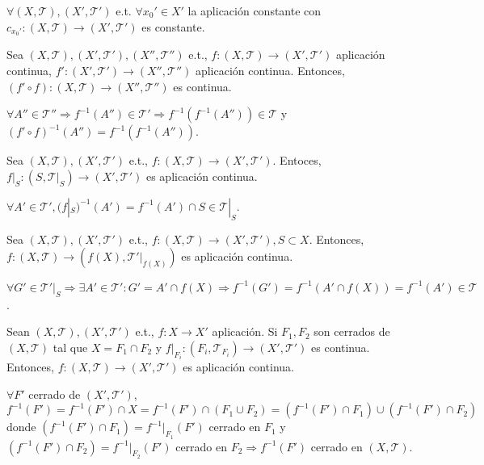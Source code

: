 \begin{obs}
  $\forall ( X, \mathcal{T} ), ( X', \mathcal{T}' )$ e.t. $\forall x_{0}' \in X'$ la aplicación constante con $c_{x_{0}'}: ( X, \mathcal{T} ) \to ( X', \mathcal{T}' )$ es constante.
\end{obs}

\begin{prop}
  Sea $( X, \mathcal{T} ), ( X', \mathcal{T}' ), ( X'', \mathcal{T}'' )$ e.t., $f: ( X, \mathcal{T} ) \to ( X', \mathcal{T}' )$ aplicación continua, $f': ( X', \mathcal{T}' ) \to ( X'', \mathcal{T}'' )$ aplicación continua. Entonces, $(f' \circ f): ( X, \mathcal{T} ) \to ( X'', \mathcal{T}'' )$ es continua.
\end{prop}

\begin{dem}
  $\forall A'' \in \mathcal{T''} \Rightarrow f^{-1}(A'') \in \mathcal{T}' \Rightarrow f^{-1}(f^{-1}(A'')) \in \mathcal{T}$ y $(f' \circ f)^{-1}(A'') = f^{-1}(f^{-1}(A''))$.
\end{dem}

\begin{prop}
  Sea $( X, \mathcal{T} ), ( X', \mathcal{T}' )$ e.t., $f: ( X, \mathcal{T} ) \to ( X', \mathcal{T}' )$. Entoces, $f|_{S}: ( S, \mathcal{T}|_{S} ) \to ( X', \mathcal{T}' )$ es aplicación continua.
\end{prop}

\begin{dem}
  $\forall A' \in \mathcal{T}', (f|_{S})^{-1}(A') = f^{-1}(A')\cap S \in \mathcal{T}|_{S}$.
\end{dem}

\begin{prop}
  Sea $( X, \mathcal{T} ), ( X', \mathcal{T}' )$ e.t., $f: ( X, \mathcal{T} ) \to ( X', \mathcal{T}' ), S \subset X$. Entonces, $f: ( X, \mathcal{T} ) \to ( f(X), \mathcal{T'}|_{f(X)})$ es aplicación continua.
\end{prop}

\begin{dem}
  $\forall G' \in \mathcal{T'}|_{S} \Rightarrow \exists A' \in \mathcal{T}': G' = A' \cap f(X) \Rightarrow f^{-1}(G') = f^{-1}(A' \cap f(X)) = f^{-1}(A') \in \mathcal{T}$.
\end{dem}

\begin{prop}
  Sean $( X, \mathcal{T} ), ( X', \mathcal{T}' )$ e.t., $f: X \to X'$ aplicación. Si $F_{1}, F_{2}$ son cerrados de $( X, \mathcal{T} )$ tal que $X = F_{1} \cap F_{2}$ y $f|_{F_{i}}: ( F_{i}, \mathcal{T}_{F_{i}}) \to ( X', \mathcal{T'} )$ es continua. Entonces, $f: ( X, \mathcal{T} ) \to ( X', \mathcal{T}' )$ es aplicación continua.
\end{prop}

\begin{dem}
  $\forall F'$ cerrado de $ ( X', \mathcal{T}' )$, $f^{-1}(F') =f^{-1}(F')\cap X = f^{-1}(F') \cap (F_{1} \cup F_{2}) = (f^{-1}(F')\cap F_{1}) \cup (f^{-1}(F')\cap F_{2})$ donde $(f^{-1}(F')\cap F_{1}) = f^{-1}|_{F_{1}}(F') $ cerrado en $F_{1}$ y $(f^{-1}(F')\cap F_{2}) = f^{-1}|_{F_{2}}(F')$ cerrado en $F_{2} \Rightarrow f^{-1}(F')$ cerrado en $( X, \mathcal{T} )$.
\end{dem}
